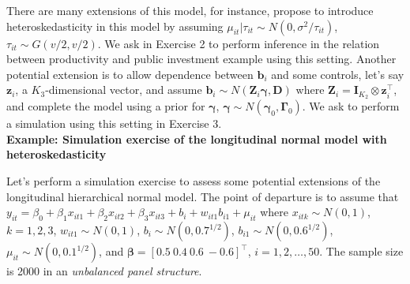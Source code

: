 There are many extensions of this model, for instance, \cite{Chib1999} propose to introduce heteroskedasticity in this model by assuming $\mu_{it}|\tau_{it}\sim N(0, \sigma^2/\tau_{it})$, $\tau_{it}\sim G(v/2,v/2)$. We ask in Exercise 2 to perform inference in the relation between productivity and public investment example using this setting. Another potential extension is to allow dependence between $\bm{b}_i$ and some controls, let's say $\bm{z}_i$, a $K_3$-dimensional vector, and assume $\bm{b}_i\sim N(\bm{Z}_i\bm{\gamma},\bm{D})$ where $\bm{Z}_i=\bm{I}_{K_2}\otimes \bm{z}_i^{\top}$, and complete the model using a prior for $\bm{\gamma}$, $\bm{\gamma}\sim N(\bm{\gamma}_0,\bm{\Gamma}_0)$. We ask to perform a simulation using this setting in Exercise 3.\\   

\textbf{Example: Simulation exercise of the longitudinal normal model with heteroskedasticity}

Let's perform a simulation exercise to assess some potential extensions of the longitudinal hierarchical normal model. The point of departure is to assume that $y_{it}=\beta_0+\beta_1x_{it1}+\beta_2x_{it2}+\beta_3x_{it3}+b_i+w_{it1}b_{i1}+\mu_{it}$ where $x_{itk}\sim N(0,1)$, $k=1,2,3$, $w_{it1}\sim N(0,1)$, $b_i\sim N(0, 0.7^{1/2})$, $b_{i1}\sim N(0, 0.6^{1/2})$, $\mu_{it}\sim N(0, 0.1^{1/2})$, and $\bm{\beta}=[0.5 \ 0.4 \ 0.6 \ -0.6]^{\top}$, $i=1,2,\dots,50$. The sample size is 2000 in an \textit{unbalanced panel structure}. 

